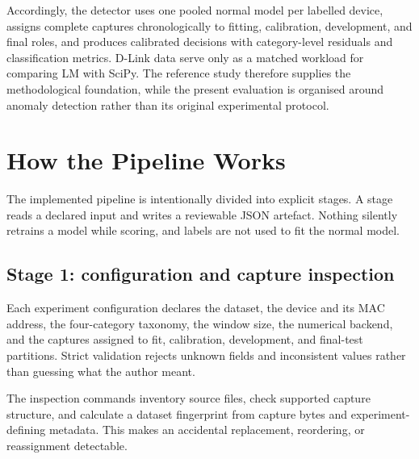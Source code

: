 \documentclass[11pt,a4paper]{article}
\begin{document}
Accordingly, the detector uses one pooled normal model per labelled device, assigns complete captures chronologically to fitting, calibration, development, and final roles, and produces calibrated decisions with category-level residuals and classification metrics. D-Link data serve only as a matched workload for comparing LM with SciPy. The reference study therefore supplies the methodological foundation, while the present evaluation is organised around anomaly detection rather than its original experimental protocol.

\section{How the Pipeline Works}

The implemented pipeline is intentionally divided into explicit stages. A stage reads a declared input and writes a reviewable JSON artefact. Nothing silently retrains a model while scoring, and labels are not used to fit the normal model.

\begin{center}
\end{center}

\subsection{Stage 1: configuration and capture inspection}

Each experiment configuration declares the dataset, the device and its MAC address, the four-category taxonomy, the window size, the numerical backend, and the captures assigned to fit, calibration, development, and final-test partitions. Strict validation rejects unknown fields and inconsistent values rather than guessing what the author meant.

The inspection commands inventory source files, check supported capture structure, and calculate a dataset fingerprint from capture bytes and experiment-defining metadata. This makes an accidental replacement, reordering, or reassignment detectable.
\end{document}
